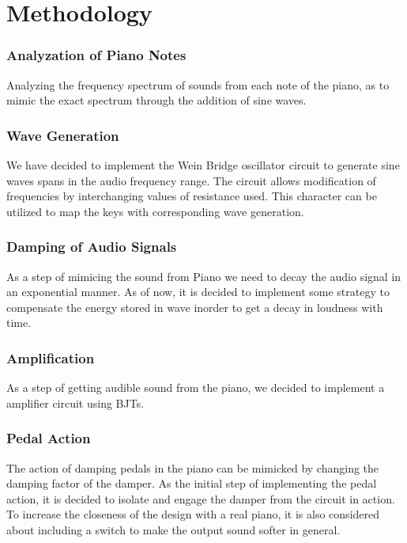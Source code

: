 \documentclass[10pt]{article}
\begin{document}
\section*{Methodology}

\subsubsection*{Analyzation of Piano Notes}
\vspace{-1.5ex}
Analyzing the frequency spectrum of sounds from each note of the piano, as to mimic the exact spectrum through the addition of sine waves.
\vspace{-1.5ex}
\subsubsection*{Wave Generation}
\vspace{-1.5ex}
We have decided to implement the Wein Bridge oscillator circuit to generate sine waves spans in the audio frequency range. The circuit allows modification of frequencies by interchanging values of resistance used. This character can be utilized to map the keys with corresponding wave generation.
\vspace{-1.5ex}
\subsubsection*{Damping of Audio Signals}
\vspace{-1.5ex}
As a step of mimicing the sound from Piano we need to decay the audio signal in an exponential manner. As of now, it is decided to implement some strategy to compensate the energy stored in wave inorder to get a decay in loudness with time.
\vspace{-1.5ex}
\subsubsection*{Amplification}
\vspace{-1.5ex}
As a step of getting audible sound from the piano, we decided to implement a amplifier circuit using  BJTs.
\vspace{-1.5ex}
\subsubsection*{Pedal Action}
\vspace{-1.5ex}
The action of damping pedals in the piano can be mimicked by changing the damping factor of the damper. As the initial step of implementing the pedal action, it is decided to isolate and engage the damper from the circuit in action.  To increase the closeness of the design with a real piano, it is also considered about including a switch to make the output sound softer in general.
\vspace{-1.5ex}
\end{document}
